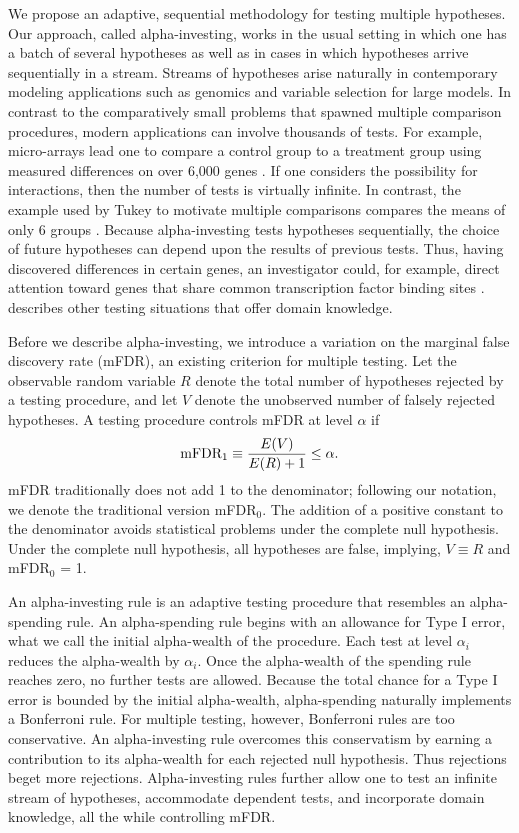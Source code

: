 \documentclass[12pt]{article}
\begin{document}
We propose an adaptive, sequential methodology for testing multiple
hypotheses. Our approach, called alpha-investing, works in the usual
setting in which one has a batch of several hypotheses as well as in
cases in which hypotheses arrive sequentially in a stream.
Streams of hypotheses arise naturally in  contemporary
modeling applications such as genomics and variable selection for
large models.  In contrast to the comparatively small problems that
spawned multiple comparison procedures, modern applications can
involve thousands of tests.  For example, micro-arrays lead one to
compare a control group to a treatment group using measured
differences on over 6,000 genes \citep{shaffer03}.  If one considers
the possibility for interactions, then the number of tests is
virtually infinite. In contrast, the example used by Tukey to motivate
multiple comparisons compares the means of only 6 groups
\citep[][available in \citet{braun94}] {tukey53}.  Because
alpha-investing tests hypotheses sequentially, the choice
of future hypotheses can depend upon the results of previous tests.
Thus, having discovered differences in certain genes, an investigator
could, for example, direct attention toward genes that share common
transcription factor binding sites \citep{gupta05}. \citet{wasserman06} 
describes other testing situations that offer domain knowledge.

Before we describe alpha-investing, we introduce a variation on
 the marginal false discovery rate (mFDR), an existing criterion for
 multiple testing.  Let the observable
 random variable $R$ denote the total number of hypotheses rejected by
 a testing procedure, and let $V$ denote the unobserved number of
 falsely rejected hypotheses.  A testing procedure controls mFDR
 at level $\alpha$ if
\begin{equation}
\label{eq:mFDR}
\hbox{mFDR}_1 \equiv \frac{E(V)}{E(R) + 1} \le \alpha.
\end{equation}
mFDR traditionally does not add 1 to the denominator; following our
notation, we denote the traditional version mFDR${}_0$. 
The addition of a positive constant to the denominator
avoids statistical problems under the complete null hypothesis.  Under the
complete null hypothesis, all hypotheses are false, implying, $V \equiv R$
and mFDR${}_{0}$ = 1. 


An alpha-investing rule is an adaptive testing procedure that
resembles an alpha-spending rule.  An
alpha-spending rule begins with an allowance for Type I error,
what we call the initial alpha-wealth of the procedure.  Each test at
level $\alpha_i$ reduces the alpha-wealth  by
$\alpha_i$.  Once the alpha-wealth of the spending rule reaches zero,
no further tests are allowed.  Because the total chance
for a Type I error is bounded by the initial alpha-wealth,
alpha-spending naturally implements a Bonferroni rule. For
multiple testing, however, Bonferroni rules are too conservative.  
An alpha-investing rule overcomes this conservatism by earning 
a contribution to its alpha-wealth for each rejected null hypothesis.  
Thus rejections beget more rejections.  Alpha-investing rules further
allow one to test an infinite stream of hypotheses, accommodate dependent tests, and incorporate domain knowledge, all the while controlling mFDR.
\end{document}
